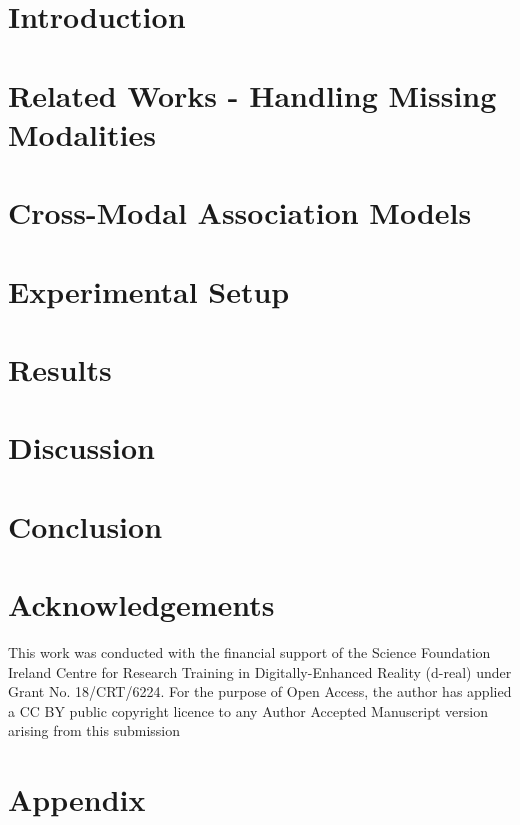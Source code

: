 \documentclass[manuscript,screen]{acmart}
\begin{document}
\section{Introduction}\label{sec:intro}


\section{Related Works - Handling Missing Modalities}\label{sec:related_works}


\section{Cross-Modal Association Models}
\label{sec:proposed_method}


\section{Experimental Setup}
\label{sec:experiments}


\section{Results}
\label{sec:results}


\section{Discussion}
\label{sec:disc}



\section{Conclusion}\label{sec:conc}


\section*{Acknowledgements}
This work was conducted with the financial support of the Science Foundation Ireland Centre for Research Training in Digitally-Enhanced Reality (d-real) under Grant No. 18/CRT/6224. For the purpose of Open Access, the author has applied a CC BY public copyright licence to any Author Accepted Manuscript version arising from this submission



\section{Appendix}
\label{sec:appendix}

\end{document}
